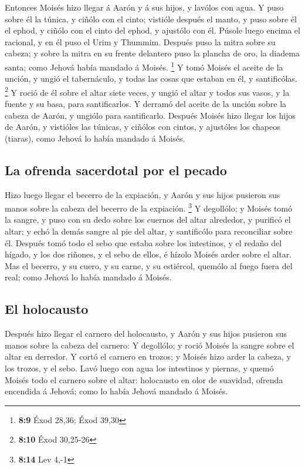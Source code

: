  Entonces Moisés hizo llegar á Aarón y á sus hijos, y
lavólos con agua.  Y puso sobre él la túnica, y ciñólo con
el cinto; vistióle después el manto, y puso sobre él el ephod, y ciñólo
con el cinto del ephod, y ajustólo con él.  Púsole luego
encima el racional, y en él puso el Urim y Thummim.  Después
puso la mitra sobre su cabeza; y sobre la mitra en su frente delantero
puso la plancha de oro, la diadema santa; como Jehová había mandado á
Moisés. \footnote{\textbf{8:9} Éxod 28,36; Éxod 39,30}  Y
tomó Moisés el aceite de la unción, y ungió el tabernáculo, y todas las
cosas que estaban en él, y santificólas. \footnote{\textbf{8:10} Éxod
  30,25-26}  Y roció de él sobre el altar siete veces, y
ungió el altar y todos sus vasos, y la fuente y su basa, para
santificarlos.  Y derramó del aceite de la unción sobre la
cabeza de Aarón, y ungiólo para santificarlo.  Después
Moisés hizo llegar los hijos de Aarón, y vistióles las túnicas, y
ciñólos con cintos, y ajustóles los chapeos (tiaras), como Jehová lo
había mandado á Moisés.

\hypertarget{la-ofrenda-sacerdotal-por-el-pecado}{%
\subsection{La ofrenda sacerdotal por el
pecado}\label{la-ofrenda-sacerdotal-por-el-pecado}}

 Hizo luego llegar el becerro de la expiación, y Aarón y
sus hijos pusieron sus manos sobre la cabeza del becerro de la
expiación. \footnote{\textbf{8:14} Lev 4,-1}  Y degollólo;
y Moisés tomó la sangre, y puso con su dedo sobre los cuernos del altar
alrededor, y purificó el altar; y echó la demás sangre al pie del altar,
y santificólo para reconciliar sobre él.  Después tomó todo
el sebo que estaba sobre los intestinos, y el redaño del hígado, y los
dos riñones, y el sebo de ellos, é hízolo Moisés arder sobre el altar.
 Mas el becerro, y su cuero, y su carne, y su estiércol,
quemólo al fuego fuera del real; como Jehová lo había mandado á Moisés.

\hypertarget{el-holocausto}{%
\subsection{El holocausto}\label{el-holocausto}}

 Después hizo llegar el carnero del holocausto, y Aarón y
sus hijos pusieron sus manos sobre la cabeza del carnero: 
Y degollólo; y roció Moisés la sangre sobre el altar en derredor.
 Y cortó el carnero en trozos; y Moisés hizo arder la
cabeza, y los trozos, y el sebo.  Lavó luego con agua los
intestinos y piernas, y quemó Moisés todo el carnero sobre el altar:
holocausto en olor de suavidad, ofrenda encendida á Jehová; como lo
había Jehová mandado á Moisés.

